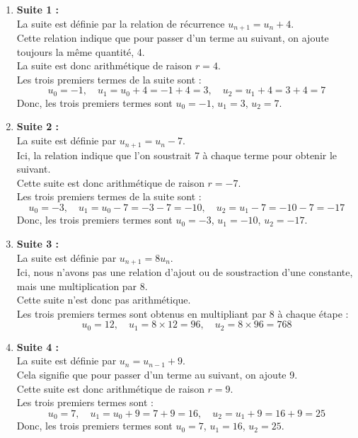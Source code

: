 \documentclass[a4paper,12pt]{article}
\begin{document}
  \begin{enumerate}
      \item \textbf{Suite 1 :} \\
      La suite est définie par la relation de récurrence $u_{n+1} = u_n + 4$. \\
      Cette relation indique que pour passer d'un terme au suivant, on ajoute toujours la même quantité, 4. \\
      La suite est donc arithmétique de raison $r = 4$. \\
      Les trois premiers termes de la suite sont :
      \[
      u_0 = -1, \quad u_1 = u_0 + 4 = -1 + 4 = 3, \quad u_2 = u_1 + 4 = 3 + 4 = 7
      \]
      Donc, les trois premiers termes sont $u_0 = -1$, $u_1 = 3$, $u_2 = 7$.
  
      \item \textbf{Suite 2 :} \\
      La suite est définie par $u_{n+1} = u_n - 7$. \\
      Ici, la relation indique que l'on soustrait 7 à chaque terme pour obtenir le suivant. \\
      Cette suite est donc arithmétique de raison $r = -7$. \\
      Les trois premiers termes de la suite sont :
      \[
      u_0 = -3, \quad u_1 = u_0 - 7 = -3 - 7 = -10, \quad u_2 = u_1 - 7 = -10 - 7 = -17
      \]
      Donc, les trois premiers termes sont $u_0 = -3$, $u_1 = -10$, $u_2 = -17$.
  
      \item \textbf{Suite 3 :} \\
      La suite est définie par $u_{n+1} = 8u_n$. \\
      Ici, nous n'avons pas une relation d'ajout ou de soustraction d'une constante, mais une multiplication par 8. \\
      Cette suite n'est donc pas arithmétique. \\
      Les trois premiers termes sont obtenus en multipliant par 8 à chaque étape :
      \[
      u_0 = 12, \quad u_1 = 8 \times 12 = 96, \quad u_2 = 8 \times 96 = 768
      \]
  
      \item \textbf{Suite 4 :} \\
      La suite est définie par $u_n = u_{n-1} + 9$. \\
      Cela signifie que pour passer d'un terme au suivant, on ajoute 9. \\
      Cette suite est donc arithmétique de raison $r = 9$. \\
      Les trois premiers termes sont :
      \[
      u_0 = 7, \quad u_1 = u_0 + 9 = 7 + 9 = 16, \quad u_2 = u_1 + 9 = 16 + 9 = 25
      \]
      Donc, les trois premiers termes sont $u_0 = 7$, $u_1 = 16$, $u_2 = 25$.
  \end{enumerate}
  
\end{document}
